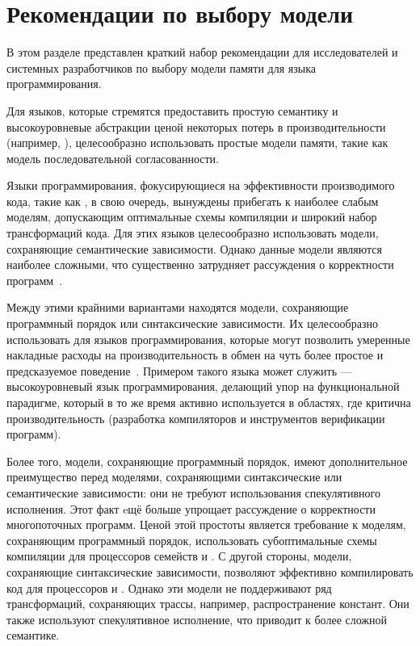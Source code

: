 \section{Рекомендации по выбору модели}
\label{sec:discussion}

В этом разделе представлен краткий набор рекомендации для 
исследователей и системных разработчиков 
по выбору модели памяти для  языка программирования.

Для языков, которые стремятся предоставить простую семантику 
и высокоуровневые абстракции ценой некоторых потерь в 
производительности (например, \Haskell), 
целесообразно использовать простые модели памяти, такие как 
модель последовательной согласованности. 

Языки программирования, фокусирующиеся на 
эффективности производимого кода, 
такие как \CPP, в свою очередь, вынуждены 
прибегать к наиболее слабым моделям, 
допускающим оптимальные схемы компиляции и 
широкий набор трансформаций кода. 
Для этих языков целесообразно использовать
модели, сохраняющие семантические зависимости. 
Однако данные модели являются наиболее сложными, 
что существенно затрудняет рассуждения о 
корректности программ~\cite{Svendsen-al:ESOP18}. 

Между этими крайними вариантами  находятся модели, 
сохраняющие программный порядок или синтаксические зависимости. 
Их целесообразно использовать для языков программирования, 
которые могут позволить умеренные накладные 
расходы на производительность в обмен 
на чуть более простое и предсказуемое поведение~\cite{Ou-Demsky:OOPSLA18}. 
Примером такого языка может служить \OCaml --- 
высокоуровневый язык программирования, делающий упор 
на функциональной парадигме, который в то же время 
активно используется в областях, где критична производительность (разработка компиляторов и инструментов верификации программ). 

Более того, модели, сохраняющие программный порядок, 
имеют дополнительное преимущество перед моделями, 
сохраняющими синтаксические или семантические зависимости: они не требуют использования 
спекулятивного исполнения. 
Этот факт eщё больше упрощает рассуждение о корректности многопоточных программ. 
Ценой этой простоты является требование к моделям, сохраняющим программный порядок, 
использовать субоптимальные схемы компиляции 
для процессоров семейств \ARM и \POWER.
С другой стороны, модели, сохраняющие синтаксические зависимости, 
позволяют эффективно компилировать код для процессоров \ARM и \POWER. Однако
эти модели не поддерживают ряд трансформаций, 
сохраняющих трассы, например, распространение констант. 
Они также используют спекулятивное исполнение, 
что приводит к более сложной семантике.  

